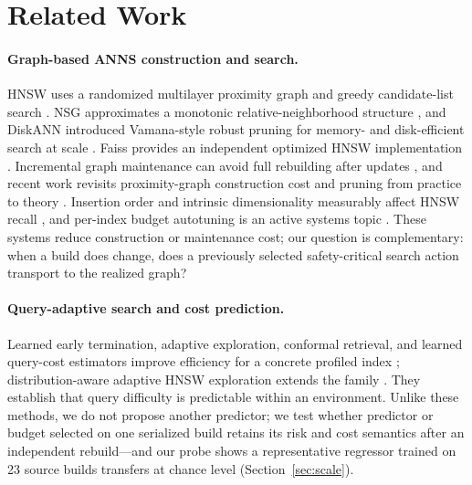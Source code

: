\documentclass{article}
\begin{document}
\section{Related Work}
\label{sec:related}

\paragraph{Graph-based ANNS construction and search.}
HNSW uses a randomized multilayer proximity graph and greedy candidate-list search
\citep{malkov2020hnsw}. NSG approximates a monotonic relative-neighborhood structure \citep{fu2019nsg}, and
DiskANN introduced Vamana-style robust pruning for memory- and disk-efficient search at scale
\citep{subramanya2019diskann}. Faiss provides an independent optimized HNSW implementation
\citep{johnson2021faiss}. Incremental graph maintenance can avoid full rebuilding after updates
\citep{xu2022maintenance}, and recent work revisits proximity-graph construction cost and pruning from
practice to theory \citep{prokhorenkova2020graph}. Insertion order and intrinsic dimensionality measurably
affect HNSW recall \citep{elliott2024order}, and per-index budget autotuning is an active systems topic
\citep{bae2026qbat}. These systems reduce construction or maintenance cost; our question is complementary:
when a build does change, does a previously selected safety-critical search action transport to the
realized graph?

\paragraph{Query-adaptive search and cost prediction.}
Learned early termination, adaptive exploration, conformal retrieval, and learned query-cost estimators
improve efficiency for a concrete profiled index
\citep{li2020learned,chatzakis2025darth,horchidan2025conann,wang2026annie}; distribution-aware adaptive
HNSW exploration extends the family \citep{zhang2026exploration}. They establish that query difficulty is
predictable within an environment. Unlike these methods, we do not propose another predictor; we test
whether predictor or budget selected on one serialized build retains its risk and cost semantics after an
independent rebuild---and our probe shows a representative regressor trained on 23 source builds transfers
at chance level (Section~\ref{sec:scale}).
\end{document}
